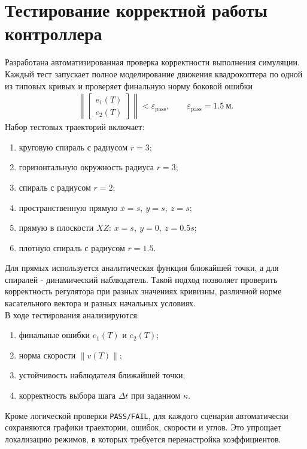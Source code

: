 
\section{Тестирование корректной работы контроллера}

Разработана автоматизированная проверка корректности выполнения симуляции.
Каждый тест запускает полное моделирование движения квадрокоптера по одной из типовых кривых и проверяет финальную норму боковой ошибки
\begin{gather}
    \left\|
        \begin{bmatrix}
            e_1(T) \\
            e_2(T)
        \end{bmatrix}
    \right\| < \varepsilon_{\mathrm{pass}},
    \qquad
    \varepsilon_{\mathrm{pass}} = 1.5 \ \text{м}.
\end{gather}
Набор тестовых траекторий включает:
\begin{enumerate}
    \item круговую спираль с радиусом $r=3$;
    \item горизонтальную окружность радиуса $r=3$;
    \item спираль с радиусом $r=2$;
    \item пространственную прямую $x=s,\ y=s,\ z=s$;
    \item прямую в плоскости $XZ$: $x=s,\ y=0,\ z=0.5s$;
    \item плотную спираль с радиусом $r=1.5$.
\end{enumerate}\hfill\break
Для прямых используется аналитическая функция ближайшей точки, а для спиралей - динамический наблюдатель.
Такой подход позволяет проверить корректность регулятора при разных значениях кривизны, различной норме касательного вектора и разных начальных условиях.\\
В ходе тестирования анализируются:
\begin{enumerate}
    \item финальные ошибки $e_1(T)$ и $e_2(T)$;
    \item норма скорости $\|v(T)\|$;
    \item устойчивость наблюдателя ближайшей точки;
    \item корректность выбора шага $\Delta t$ при заданном $\kappa$.
\end{enumerate}\hfill\break
Кроме логической проверки \texttt{PASS/FAIL}, для каждого сценария автоматически сохраняются графики траектории, ошибок, скорости и углов.
Это упрощает локализацию режимов, в которых требуется перенастройка коэффициентов.

